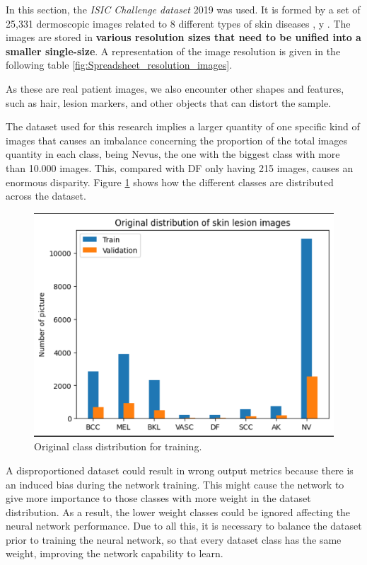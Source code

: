 In this section, the \textit{ISIC Challenge dataset}  2019 was used.  It is formed by a set of 25,331 dermoscopic images related to 8 different types of skin diseases \cite{dataset_ref_1}, \cite{dataset_ref_2} y \cite{dataset_ref_3}. The images are stored in \textbf{various resolution sizes that need to be unified into a smaller single-size}. A representation of the image resolution is given in the following table \ref{fig:Spreadsheet_resolution_images}. 

\newpage
As these are real patient images, we also encounter other shapes and features, such as hair, lesion markers, and other objects that can distort the sample.

The dataset used for this research implies a larger quantity of one specific kind of images that causes an imbalance concerning the proportion of the total images quantity in each class, being Nevus, the one with the biggest class with more than 10.000 images. This, compared with DF only having 215 images, causes an enormous disparity. Figure \ref{fig:class_distribution_for_train} shows how the different classes are distributed across the dataset. 

\begin{figure}[ht]
    \centering
        \includegraphics[scale=0.75]{images/Building/Original_distribution_skin_lesion_images.png}
        \caption{Original class distribution for training.}
    \label{fig:class_distribution_for_train}
\end{figure}


A disproportioned dataset could result in wrong output metrics because there is an induced bias during the network training. This might cause the network to give more importance to those classes with more weight in the dataset distribution. As a result, the lower weight classes could be ignored affecting the neural network performance. Due to all this, it is necessary to balance the dataset prior to training the neural network, so that every dataset class has the same weight, improving the network capability to learn. 

